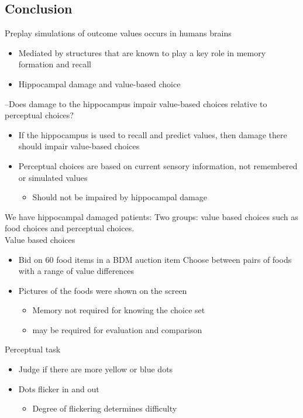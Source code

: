 \subsection{Conclusion}
Preplay simulations of outcome values occurs in humans brains
\begin{itemize}
    \item Mediated by structures that are known to play a key role in memory formation and recall
\end{itemize}
\begin{itemize}
    \item Hippocampal damage and value-based choice
\end{itemize}
–Does damage to the hippocampus impair value-based choices relative to perceptual
choices?
\begin{itemize}
    \item If the hippocampus is used to recall and predict values, then damage there should
impair value-based choices
\item Perceptual choices are based on current sensory information, not remembered or
simulated values
\begin{itemize}
    \item Should not be impaired by hippocampal damage

\end{itemize}
\end{itemize}
We have hippocampal damaged patients: Two groups: value based choices such as food choices and perceptual choices.
\\Value based choices
\begin{itemize}
    \item Bid on 60 food items in a BDM auction
    item Choose between pairs of foods with a range of value differences
    \item Pictures of the foods were shown on the screen
    \begin{itemize}
        \item Memory not required for knowing the choice set
        \item may be required for evaluation and comparison
    \end{itemize}
\end{itemize}
Perceptual task
\begin{itemize}
    \item Judge if there are more yellow or blue dots
    \item Dots flicker in and out
    \begin{itemize}
        \item Degree of flickering determines difficulty
    \end{itemize}
\end{itemize}
